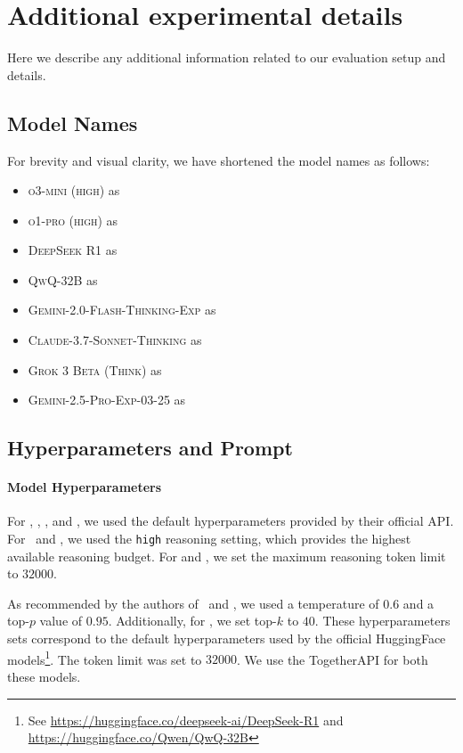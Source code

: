\section{Additional experimental details}
\label{app:exp}
Here we describe any additional information related to our evaluation setup and details.
\subsection{Model Names}
\label{app:exp_abb}
For brevity and visual clarity, we have shortened the model names as follows:
\begin{itemize}
    \item \textsc{o3-mini (high)} as \othree
    \item \textsc{o1-pro (high)} as \oone
    \item \textsc{DeepSeek R1} as \rone
    \item \textsc{QwQ-32B} as \qwq
    \item \textsc{Gemini-2.0-Flash-Thinking-Exp} as \flthink
    \item \textsc{Claude-3.7-Sonnet-Thinking} as \claude
    \item \textsc{Grok 3 Beta (Think)} as \grok
    \item \textsc{Gemini-2.5-Pro-Exp-03-25} as \geminipro
\end{itemize}

\subsection{Hyperparameters and Prompt}
\label{app:exp_prompt}

\paragraph{Model Hyperparameters} For \othree, \oone, \claude, and \flthink, we used the default hyperparameters provided by their official API. For \othree~and \oone, we used the \texttt{high} reasoning setting, which provides the highest available reasoning budget. For \claude and \flthink, we set the maximum reasoning token limit to $32000$.

As recommended by the authors of \rone~and \qwq, we used a temperature of $0.6$ and a top-$p$ value of $0.95$. Additionally, for \qwq, we set top-$k$ to $40$. These hyperparameters sets correspond to the default hyperparameters used by the official HuggingFace models\footnote{See \url{https://huggingface.co/deepseek-ai/DeepSeek-R1} and \url{https://huggingface.co/Qwen/QwQ-32B}}. The token limit was set to $32000$. We use the TogetherAPI for both these models.

